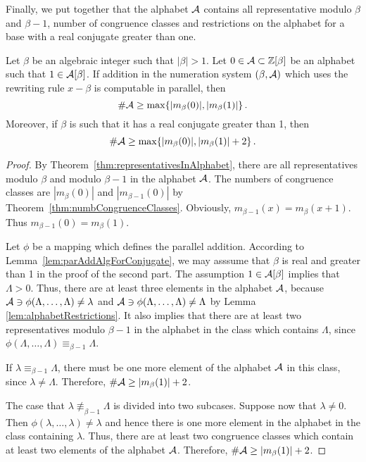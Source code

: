Finally, we put together that the alphabet $\mathcal{A}$ contains all representative modulo $\beta$ and $\beta-1$, number of congruence classes and restrictions on the alphabet for a base with a real conjugate greater than one.
\begin{thm}
Let $\beta$ be an algebraic integer such that $|\beta|>1$. Let $0\in \mathcal{A}\subset \mathbb{Z}[\beta]$ be an alphabet such that $1\in \mathcal{A}[\beta]$. If addition in the numeration system $(\beta, \mathcal{A})$ which uses the rewriting rule $x-\beta$ is computable in parallel, then
$$
\#\mathcal{A} \geq \max \{|m_\beta(0)|, |m_\beta(1)|\}\,.
$$
Moreover, if $\beta$ is such that it has a real conjugate greater than 1, then 
$$
\#\mathcal{A} \geq \max \{|m_\beta(0)|, |m_\beta(1)|+2\}\,.
$$
\end{thm}
\begin{proof}
By Theorem~\ref{thm:representativesInAlphabet}, there are all representatives modulo $\beta$ and modulo $\beta-1$ in the alphabet $\mathcal{A}$. The numbers of congruence classes are $|m_\beta(0)|$ and $|m_{\beta-1}(0)|$ by Theorem~\ref{thm:numbCongruenceClasses}. Obviously, $m_{\beta-1}(x) = m_\beta (x+1)$. Thus $m_{\beta-1}(0) = m_\beta (1)$.

Let $\phi$ be a mapping which defines the parallel addition. According to Lemma~\ref{lem:parAddAlgForConjugate}, we may asssume that $\beta$ is real and greater than 1 in the proof of the second part. The assumption $1\in \mathcal{A}[\beta]$ implies that $\Lambda>0$. Thus, there are at least three elements in the alphabet $\mathcal{A}$, because $\mathcal{A}\ni\phi(\Lambda,\dots,\Lambda)\neq \lambda$ and $\mathcal{A}\ni\phi(\Lambda,\dots,\Lambda)\neq \Lambda$ by Lemma \ref{lem:alphabetRestrictions}. It also implies that there are at least two representatives modulo $\beta-1$ in the alphabet in the class which contains $\Lambda$, since $\phi(\Lambda,\dots,\Lambda)\equiv_{\beta-1} \Lambda$.  

If $\lambda\equiv_{\beta-1}\Lambda$, there must be one more element of the alphabet $\mathcal{A}$ in this class, since $\lambda \neq \Lambda$. Therefore, $\#\mathcal{A}\geq |m_\beta(1)|+2$. 

The case that $\lambda\not\equiv_{\beta-1}\Lambda$ is divided into two subcases. Suppose now that $\lambda\neq 0$. Then $\phi(\lambda,\dots,\lambda)\neq \lambda$ and hence there is one more element in the alphabet in the class containing $\lambda$. Thus, there are at least two congruence classes which contain at least two elements of the alphabet $\mathcal{A}$. Therefore, $\#\mathcal{A}\geq |m_\beta(1)|+2$.


\end{proof}

